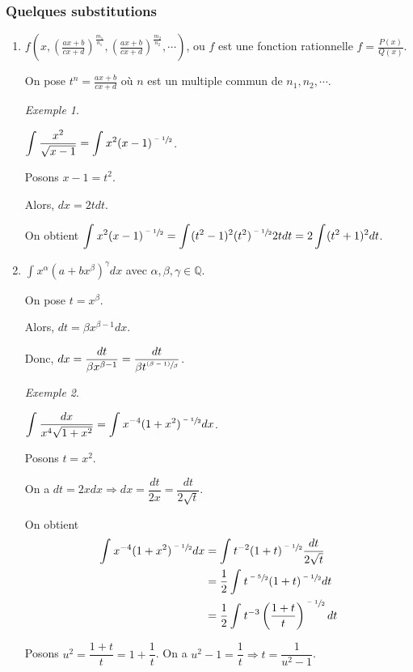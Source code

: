 \documentclass{report}
\newcommand*{\dint}[3]{\displaystyle\int_{#1}^{#2}#3}
\newcommand*{\rationels}{\mathbb{Q}}
\theoremstyle{definition}
\theoremstyle{remark}
\newtheorem*{exem}{Exemple}
\begin{document}
	\subsubsection{Quelques substitutions}
	\begin{enumerate}
		\item $f\left( x,\left( \frac{ax+b}{cx+d} \right)^\frac{m_1}{n_1}, \left( \frac{ax+b}{cx+d} \right)^\frac{m_2}{n_2}, \dotsb \right)$, ou $f$ est une fonction rationnelle $f=\frac{P(x)}{Q(x)}$.

		On pose $t^n=\frac{ax+b}{cx+d}$ o\`u $n$ est un multiple commun de $n_1,n_2,\dotsb$.
		\begin{exem}
			~

			$\dint{}{}{\dfrac{x^2}{\sqrt{x-1}}} = \dint{}{}{x^2(x-1)^{\sfrac{-1}{2}}}$.

			Posons $x-1=t^2$.

			Alors, $dx=2t dt$.

			On obtient $\dint{}{}{x^2(x-1)^{\sfrac{-1}{2}}} = \dint{}{}{(t^2-1)^2(t^2)^{\sfrac{-1}{2}}2tdt} = 2 \dint{}{}{(t^2+1)^2 dt}$.
		\end{exem}
		\item $\dint{}{}{x^\alpha(a+bx^\beta)^\gamma dx}$ avec $\alpha,\beta,\gamma \in \rationels$.

		On pose $t=x^\beta$.

		Alors, $dt = \beta x^{\beta-1} dx$.

		Donc, $dx = \dfrac{dt}{\beta x^{\beta-1}} = \dfrac{dt}{\beta t^{\sfrac{(\beta-1)}{\beta}}}$.
		\begin{exem}~

			$\dint{}{}{\dfrac{dx}{x^4\sqrt{1+x^2}}} = \dint{}{}{x^{-4}(1+x^2)^{\sfrac{-1}{2}} dx}$.

			Posons $t=x^2$.

			On a $dt=2xdx \Rightarrow dx=\dfrac{dt}{2x} = \dfrac{dt}{2\sqrt{t}}$.

			On obtient
			\begin{align*}
				\dint{}{}{x^{-4}(1+x^2)^{\sfrac{-1}{2}} dx}&= \dint{}{}{t^{-2} (1+t)^{\sfrac{-1}{2}} \dfrac{dt}{2\sqrt{t}}}\\
				&= \dfrac{1}{2} \dint{}{}{t^{\sfrac{-5}{2}}(1+t)^{\sfrac{-1}{2}} dt}\\
				&=\dfrac{1}{2}\dint{}{}{t^{-3}\left(\dfrac{1+t}{t}\right)^{\sfrac{-1}{2}} dt}
			\end{align*}

			Posons $u^2=\dfrac{1+t}{t} = 1+\dfrac{1}{t}$. On a $u^2-1=\dfrac{1}{t} \Rightarrow t=\dfrac{1}{u^2-1}$.


\end{exem}
\end{enumerate}
\end{document}
